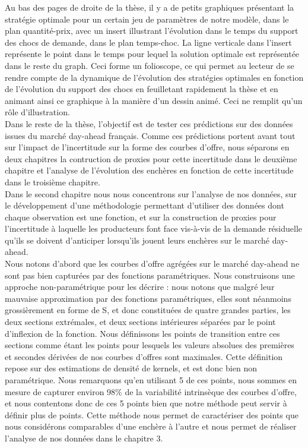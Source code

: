 Au bas des pages de droite de la thèse, il y a de petits graphiques présentant la stratégie optimale pour un certain jeu de paramètres de notre modèle, dans le plan quantité-prix, avec un insert illustrant l'évolution dans le temps du support des chocs de demande, dans le plan temps-choc. La ligne verticale dans l'insert représente le point dans le temps pour lequel la solution optimale est représentée dans le reste du graph. Ceci forme un folioscope, ce qui permet au lecteur de se rendre compte de la dynamique de l'évolution des stratégies optimales en fonction de l'évolution du support des chocs en feuilletant rapidement la thèse et en animant ainsi ce graphique à la manière d'un dessin animé. Ceci ne remplit qu'un rôle d'illustration. \\

Dans le reste de la thèse, l'objectif est de tester ces prédictions sur des données issues du marché day-ahead français. Comme ces prédictions portent avant tout sur l'impact de l'incertitude sur la forme des courbes d'offre, nous séparons en deux chapitres la contruction de proxies pour cette incertitude dans le deuxième chapitre et l'analyse de l'évolution des enchères en fonction de cette incertitude dans le troisième chapitre.\\

Dans le second chapitre nous nous concentrons sur l'analyse de nos données, sur le développement d'une méthodologie permettant d'utiliser des données dont chaque observation est une fonction, et sur la construction de proxies pour l'incertitude à laquelle les producteurs font face vis-à-vis de la demande résiduelle qu'ils se doivent d'anticiper lorsqu'ils jouent leurs enchères sur le marché day-ahead.\\

Nous notons d'abord que les courbes d'offre agrégées sur le marché day-ahead ne sont pas bien capturées par des fonctions paramétriques. Nous construisons une approche non-paramétrique pour les décrire : nous notons que malgré leur mauvaise approximation par des fonctions paramétriques, elles sont néanmoins grossièrement en forme de S, et donc constituées de quatre grandes parties, les deux sections extrémales, et deux sections intérieures séparées par le point d'inflexion de la fonction. Nous définissons les points de transition entre ces sections comme étant les points pour lesquels les valeurs absolues des premières et secondes dérivées de nos courbes d'offres sont maximales. Cette définition repose sur des estimations de densité de kernels, et est donc bien non paramétrique. Nous remarquons qu'en utilisant 5 de ces points, nous sommes en mesure de capturer environ 98\% de la variabilité intrinsèque des courbes d'offre, et nous contentons donc de ces 5 points bien que notre méthode peut servir à définir plus de points. Cette méthode nous permet de caractériser des points que nous considérons comparables d'une enchère à l'autre et nous permet de réaliser l'analyse de nos données dans le chapitre 3.\\

